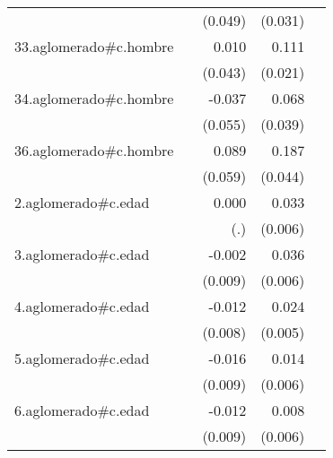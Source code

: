 {\begin{longtable}{l*{4}{D{.}{.}{-1}}}
            &                     &     (0.049)         &     (0.031)         &                     \\
\addlinespace
33.aglomerado#c.hombre&                     &       0.010         &       0.111\sym{***}&                     \\
            &                     &     (0.043)         &     (0.021)         &                     \\
\addlinespace
34.aglomerado#c.hombre&                     &      -0.037         &       0.068         &                     \\
            &                     &     (0.055)         &     (0.039)         &                     \\
\addlinespace
36.aglomerado#c.hombre&                     &       0.089         &       0.187\sym{***}&                     \\
            &                     &     (0.059)         &     (0.044)         &                     \\
\addlinespace
2.aglomerado#c.edad&                     &       0.000         &       0.033\sym{***}&                     \\
            &                     &         (.)         &     (0.006)         &                     \\
\addlinespace
3.aglomerado#c.edad&                     &      -0.002         &       0.036\sym{***}&                     \\
            &                     &     (0.009)         &     (0.006)         &                     \\
\addlinespace
4.aglomerado#c.edad&                     &      -0.012         &       0.024\sym{***}&                     \\
            &                     &     (0.008)         &     (0.005)         &                     \\
\addlinespace
5.aglomerado#c.edad&                     &      -0.016         &       0.014\sym{*}  &                     \\
            &                     &     (0.009)         &     (0.006)         &                     \\
\addlinespace
6.aglomerado#c.edad&                     &      -0.012         &       0.008         &                     \\
            &                     &     (0.009)         &     (0.006)         &                     \\

\end{longtable}}
